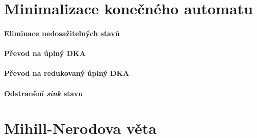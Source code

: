 
\section{Minimalizace konečného automatu}

\paragraph*{Eliminace nedosažitelných stavů} 

\paragraph*{Převod na úplný DKA} 

\paragraph*{Převod na redukovaný úplný DKA} 

\paragraph*{Odstranění \textit{sink} stavu} 


\section{Mihill-Nerodova věta}

